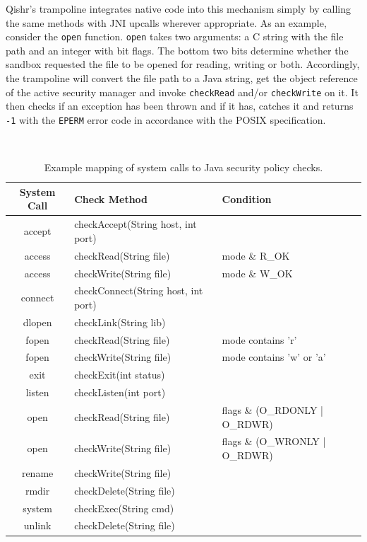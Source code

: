 \documentclass[a4paper,12pt,twoside,openright]{report}
\begin{document}
Qishr's trampoline integrates native code into this mechanism simply by calling the same methods with JNI upcalls wherever appropriate. As an example, consider the \texttt{open} function. \texttt{open} takes two arguments: a C string with the file path and an integer with bit flags. The bottom two bits determine whether the sandbox requested the file to be opened for reading, writing or both. Accordingly, the trampoline will convert the file path to a Java string, get the object reference of the active security manager and invoke \texttt{checkRead} and/or \texttt{checkWrite} on it. It then checks if an exception has been thrown and if it has, catches it and returns \texttt{-1} with the \texttt{EPERM} error code in accordance with the POSIX specification.

\begin{table}
	\centering
	\scriptsize
	\tt
	\begin{tabular}{|c|l|l|}
		\hline
		\normalfont\bfseries System Call	& \normalfont\bfseries Check Method	& \normalfont\bfseries Condition \\
		\hline
		accept						& checkAccept(String host, int port) 		& \\
		access						& checkRead(String file)				& mode \& R\_OK  \\
		access						& checkWrite(String file)				& mode \& W\_OK \\
		connect						& checkConnect(String host, int port)		& \\
		dlopen						& checkLink(String lib)				& \\
		fopen						& checkRead(String file)				& mode \textnormal{contains} 'r' \\
		fopen						& checkWrite(String file)				& mode \textnormal{contains} 'w' \textnormal{or} 'a' \\
		exit							& checkExit(int status)				& \\
		listen						& checkListen(int port)				& \\
		open							& checkRead(String file)				& flags \& (O\_RDONLY | O\_RDWR) \\
		open							& checkWrite(String file)				& flags \& (O\_WRONLY | O\_RDWR) \\
		rename						& checkWrite(String file)				& \\
		rmdir						& checkDelete(String file)				& \\
		system						& checkExec(String cmd)				& \\
		unlink						& checkDelete(String file)				& \\
		\hline
	\end{tabular}
	\normalfont\normalsize
	\caption{Example mapping of system calls to Java security policy checks.}
	\label{table:SecurityChecks}
\end{table}
\end{document}
